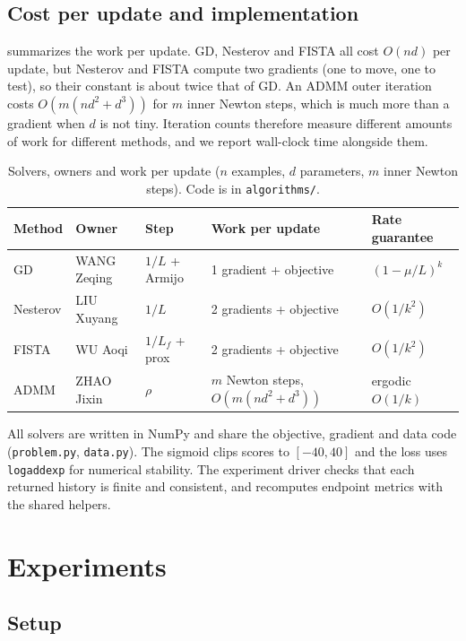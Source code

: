 \documentclass{article}
\begin{document}
\subsection{Cost per update and implementation}
 summarizes the work per update. GD, Nesterov and FISTA all cost $O(nd)$ per update, but Nesterov and FISTA compute two gradients (one to move, one to test), so their constant is about twice that of GD. An ADMM outer iteration costs $O(m(nd^2+d^3))$ for $m$ inner Newton steps, which is much more than a gradient when $d$ is not tiny. Iteration counts therefore measure different amounts of work for different methods, and we report wall-clock time alongside them.

\begin{table}[t]
\caption{Solvers, owners and work per update ($n$ examples, $d$ parameters, $m$ inner Newton steps). Code is in \texttt{algorithms/}.}
\label{tab:roles}
\centering
\small
\begin{tabular}{lllll}
\toprule
Method & Owner & Step & Work per update & Rate guarantee \\
\midrule
GD & WANG Zeqing & $1/L$ + Armijo & 1 gradient + objective & $(1-\mu/L)^k$\\
Nesterov & LIU Xuyang & $1/L$ & 2 gradients + objective & $O(1/k^2)$\\
FISTA & WU Aoqi & $1/L_f$ + prox & 2 gradients + objective & $O(1/k^2)$\\
ADMM & ZHAO Jixin & $\rho$ & $m$ Newton steps, $O(m(nd^2{+}d^3))$ & ergodic $O(1/k)$\\
\bottomrule
\end{tabular}
\end{table}

All solvers are written in NumPy and share the objective, gradient and data code (\texttt{problem.py}, \texttt{data.py}). The sigmoid clips scores to $[-40,40]$ and the loss uses \texttt{logaddexp} for numerical stability. The experiment driver checks that each returned history is finite and consistent, and recomputes endpoint metrics with the shared helpers.

\section{Experiments}
\label{sec:results}

\subsection{Setup}
\end{document}
